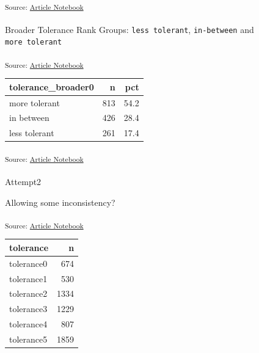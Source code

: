 \documentclass[
  letterpaper,
  DIV=11,
  numbers=noendperiod]{scrartcl}
\makeatletter
\let\oldparagraph\paragraph
\renewcommand{\paragraph}{
    \@ifstar
      \xxxParagraphStar
      \xxxParagraphNoStar
  }
\newcommand{\xxxParagraphStar}[1]{\oldparagraph*{#1}\mbox{}}
\newcommand{\xxxParagraphNoStar}[1]{\oldparagraph{#1}\mbox{}}
\makeatother
\begin{document}
\textsubscript{Source:
\href{https://h-christy.github.io/data-ethics-final/index.qmd.html}{Article
Notebook}}

\paragraph{\texorpdfstring{Broader Tolerance Rank Groups:
\texttt{less\ tolerant}, \texttt{in-between} and
\texttt{more\ tolerant}}{Broader Tolerance Rank Groups: less tolerant, in-between and more tolerant}}\label{broader-tolerance-rank-groups-less-tolerant-in-between-and-more-tolerant}

\textsubscript{Source:
\href{https://h-christy.github.io/data-ethics-final/index.qmd.html}{Article
Notebook}}

\begin{longtable}[]{@{}lrr@{}}
\toprule\noalign{}
tolerance\_broader0 & n & pct \\
\midrule\noalign{}
\endhead
\bottomrule\noalign{}
\endlastfoot
more tolerant & 813 & 54.2 \\
in between & 426 & 28.4 \\
less tolerant & 261 & 17.4 \\
\end{longtable}

\textsubscript{Source:
\href{https://h-christy.github.io/data-ethics-final/index.qmd.html}{Article
Notebook}}

\paragraph{Attempt2}\label{attempt2}

Allowing some inconsistency?

\textsubscript{Source:
\href{https://h-christy.github.io/data-ethics-final/index.qmd.html}{Article
Notebook}}

\begin{longtable}[]{@{}lr@{}}
\toprule\noalign{}
tolerance & n \\
\midrule\noalign{}
\endhead
\bottomrule\noalign{}
\endlastfoot
tolerance0 & 674 \\
tolerance1 & 530 \\
tolerance2 & 1334 \\
tolerance3 & 1229 \\
tolerance4 & 807 \\
tolerance5 & 1859 \\
\end{longtable}
\end{document}
